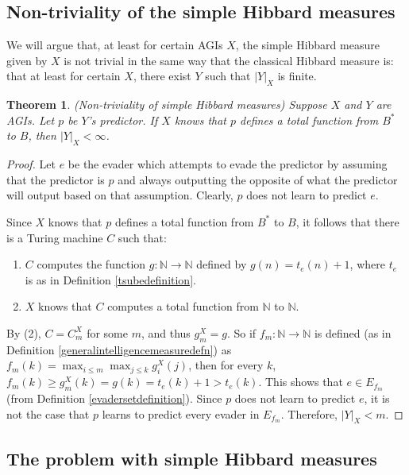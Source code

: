 \documentclass{article}
\newtheorem{theorem}{Theorem}
\begin{document}
\subsection{Non-triviality of the simple Hibbard measures}

We will argue that, at least for certain AGIs $X$,
the simple Hibbard measure given by $X$ is
not trivial in the same way that the classical Hibbard measure is:
that at least for certain $X$, there exist $Y$ such that
$|Y|_X$ is finite.

\begin{theorem}
\label{simplehibbardnontrivialtheorem}
    (Non-triviality of simple Hibbard measures)
    Suppose $X$ and $Y$ are AGIs. Let $p$ be $Y$'s predictor.
    If $X$ knows that $p$ defines a total function from $B^*$ to $B$,
    then $|Y|_X<\infty$.
\end{theorem}

\begin{proof}
    Let $e$ be the evader which attempts to evade the predictor by assuming
    that the predictor is $p$ and always outputting the opposite of what
    the predictor will output based on that assumption. Clearly, $p$ does
    not learn to predict $e$.

    Since $X$ knows that $p$ defines a total function from $B^*$ to $B$,
    it follows that there is a Turing machine $C$ such that:
    \begin{enumerate}
        \item
        $C$ computes the function $g:\mathbb N\to \mathbb N$ defined by
        $g(n)=t_e(n)+1$, where $t_e$ is as in
        Definition \ref{tsubedefinition}.
        \item
        $X$ knows that $C$ computes a total function from $\mathbb N$ to $\mathbb N$.
    \end{enumerate}
    By (2), $C=C^X_m$ for some $m$, and thus $g^X_m=g$.
    So if $f_m:\mathbb N\to\mathbb N$ is defined
    (as in Definition \ref{generalintelligencemeasuredefn})
    as $f_m(k)=\max_{i\leq m}\max_{j\leq k}g^X_i(j)$,
    then for every $k$, $f_m(k)\geq g^X_m(k)=g(k)=t_e(k)+1>t_e(k)$.
    This shows that $e\in E_{f_m}$ (from Definition \ref{evadersetdefinition}).
    Since $p$ does not learn to predict $e$,
    it is not the case that $p$ learns to predict every evader in $E_{f_m}$.
    Therefore, $|Y|_X<m$.
\end{proof}

\subsection{The problem with simple Hibbard measures}
\label{problemwithsimplehibbardsection}
\end{document}
